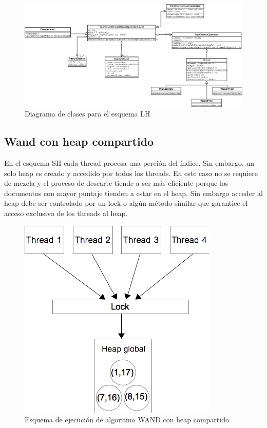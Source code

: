 \begin{list}{}{}
\begin{figure}[H]
\centering
\includegraphics[scale=.75]{images/TopKMultiThreadWandOperatorLocal.png}
\caption{Diagrama de clases para el esquema LH}
\label{fig:TopKMultiThreadWandOperatorLocal}
\end{figure}


\subsection{Wand con heap compartido}
\label{scheduling:whc}
En el esquema SH cada thread procesa una perción del índice. Sin embargo, un solo heap es creado y accedido por todos los threads. En este caso no se requiere de mezcla y el proceso de descarte tiende a ser más eficiente porque los documentos con mayor puntaje tienden a estar en el heap. Sin embargo acceder al heap debe ser controlado por un lock o algún método similar que garantice el acceso exclusivo de los threads al heap.

\begin{figure}[H]
\centering
\includegraphics[scale=.75]{images/wand-heap-compartido.png}
\caption{Esquema de ejecución de algoritmo WAND con heap compartido}
\label{fig:wand-heap-compartido}
\end{figure}


\end{list}
